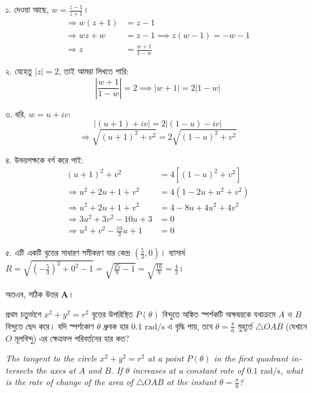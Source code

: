 \documentclass[12pt, a4paper]{article}
\begin{document}
\begin{tcolorbox}[solutionbox={সমাধান (Solution)}]
    \noindent
    ১. দেওয়া আছে, $w = \frac{z - 1}{z + 1}$। 
    \begin{align*}
        \Rightarrow w(z + 1) &= z - 1 \\
        \Rightarrow wz + w &= z - 1 \implies z(w - 1) = -w - 1 \\
        \Rightarrow z &= \frac{w + 1}{1 - w}
    \end{align*}
    
    ২. যেহেতু $|z| = 2$, তাই আমরা লিখতে পারি: 
    \[ \left|\frac{w + 1}{1 - w}\right| = 2 \implies |w + 1| = 2|1 - w| \]
    
    ৩. ধরি, $w = u + iv$: 
    \[ |(u + 1) + iv| = 2|(1 - u) - iv| \]
    \[ \Rightarrow \sqrt{(u + 1)^2 + v^2} = 2\sqrt{(1 - u)^2 + v^2} \]
    
    ৪. উভয়পক্ষকে বর্গ করে পাই: 
    \begin{align*}
        (u + 1)^2 + v^2 &= 4\left[(1 - u)^2 + v^2\right] \\
        \Rightarrow u^2 + 2u + 1 + v^2 &= 4(1 - 2u + u^2 + v^2) \\
        \Rightarrow u^2 + 2u + 1 + v^2 &= 4 - 8u + 4u^2 + 4v^2 \\
        \Rightarrow 3u^2 + 3v^2 - 10u + 3 &= 0 \\
        \Rightarrow u^2 + v^2 - \frac{10}{3}u + 1 &= 0
    \end{align*}
    
    ৫. এটি একটি বৃত্তের সাধারণ সমীকরণ যার কেন্দ্র $\left(\frac{5}{3}, 0\right)$। 
    ব্যাসার্ধ $R = \sqrt{\left(-\frac{5}{3}\right)^2 + 0^2 - 1} = \sqrt{\frac{25}{9} - 1} = \sqrt{\frac{16}{9}} = \frac{4}{3}$। 
    
    অতএব, সঠিক উত্তর \textbf{A}।
\end{tcolorbox}

\vspace{2em}

\begin{tcolorbox}[questionbox={প্রশ্ন (Question) 40}]
    \noindent
    প্রথম চতুর্ভাগে $x^2 + y^2 = r^2$ বৃত্তের উপরিস্থিত $P(\theta)$ বিন্দুতে অঙ্কিত স্পর্শকটি অক্ষদ্বয়কে যথাক্রমে $A$ ও $B$ বিন্দুতে ছেদ করে। যদি স্পর্শকোণ $\theta$ ধ্রুবক হার $0.1 \text{ rad/s}$ এ বৃদ্ধি পায়, তবে $\theta = \frac{\pi}{6}$ মুহূর্তে $\triangle OAB$ (যেখানে $O$ মূলবিন্দু) এর ক্ষেত্রফল পরিবর্তনের হার কত?
    
    \vspace{0.8em}
    \begin{english}
    \noindent\textit{\color{darkgray}
    The tangent to the circle $x^2 + y^2 = r^2$ at a point $P(\theta)$ in the first quadrant intersects the axes at $A$ and $B$. If $\theta$ increases at a constant rate of $0.1 \text{ rad/s}$, what is the rate of change of the area of $\triangle OAB$ at the instant $\theta = \frac{\pi}{6}$?
    }
    \end{english}
\end{tcolorbox}
\end{document}
